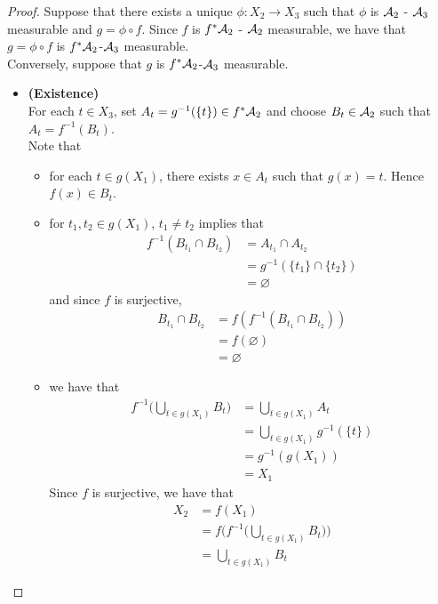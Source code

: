 \documentclass{book}
\begin{document}
	\begin{proof}
		Suppose that there exists a unique $\phi: X_2 \rightarrow X_3$ such that $\phi$ is $\mathcal{A}_2$ - $\mathcal{A}_3$ measurable and $g = \phi \circ f$. Since $f$ is $f^* \mathcal{A}_2$ - $\mathcal{A}_2$ measurable, we have that $g = \phi \circ f$ is $f^*\mathcal{A}_2$-$\mathcal{A}_3$ measurable.  \\
		Conversely, suppose that $g$ is $f^*\mathcal{A}_2$-$\mathcal{A}_3$ measurable. \\
		\begin{itemize}
			\item \textbf{(Existence)} \\
			For each $t \in X_3$, set $A_t = g^{-1}(\{t\}) \in f^* \mathcal{A}_2$ and choose $B_t \in \mathcal{A}_2$ such that $A_t = f^{-1}(B_t)$. \\
			Note that 
			\begin{itemize}
				\item for each $t \in g(X_1)$, there exists $x \in A_t$ such that $g(x) = t$. Hence $f(x) \in B_t$.\\
				\item for $t_1, t_2 \in g(X_1)$, $t_1 \neq t_2$ implies that
				\begin{align*}
					f^{-1}(B_{t_1} \cap B_{t_2}) 
					&= A_{t_1} \cap A_{t_2} \\
					&= g^{-1}(\{t_1\} \cap \{t_2\}) \\
					&= \varnothing
				\end{align*}	 
				and since $f$ is surjective, 
				\begin{align*}
					B_{t_1} \cap  B_{t_2} 
					& = f(f^{-1}(B_{t_1} \cap  B_{t_2} )) \\
					&= f(\varnothing) \\
					&= \varnothing
				\end{align*}
				\item we have that 
				\begin{align*}
					f^{-1} \bigg( \bigcup_{t \in g(X_1)} B_t\bigg) 
					&=  \bigcup_{t \in g(X_1)} A_t \\
					&= \bigcup_{t \in g(X_1)} g^{-1}(\{t\}) \\
					&= g^{-1}(g(X_1)) \\
					&= X_1
				\end{align*}
				Since $f$ is surjective, we have that 
				\begin{align*}
					X_2
					&= f(X_1) \\
					&= f \bigg( f^{-1} \bigg( \bigcup_{t \in g(X_1)} B_t\bigg)  \bigg) \\
					&= \bigcup_{t \in g(X_1)} B_t

\end{align*}
\end{itemize}
\end{itemize}
\end{proof}
\end{document}
